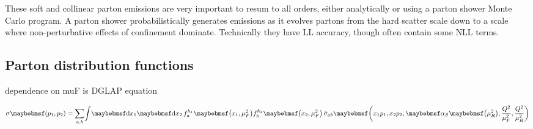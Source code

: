 These soft and collinear parton emissions are very important to resum to all orders, 
either analytically or using a parton shower Monte Carlo program. A parton shower 
probabilistically generates emissions as it evolves partons from the hard scatter scale 
down to a scale where non-perturbative effects of confinement dominate. Technically they 
have \ac{LL} accuracy, though often contain some \ac{NLL} terms.



\subsection{Parton distribution functions}
\label{sec:qcd:pdf}

dependence on muF is DGLAP equation

\begin{equation}
	\sigma\parenths{p_1, p_2} = 
	\sum\limits_{a, b} \! \int \! \d{x_1} \d{x_2} \,
	f_a^{h_1} \parenths{x_1, \mu_F^2} f_b^{h_2} \parenths{x_2, \mu_F^2} \,
	\hat{\sigma}_{ab} \parenths{x_1 p_1, x_2 p_2, \alphaS\parenths{\mu_R^2}, \frac{Q^2}{\mu_F^2}, \frac{Q^2}{\mu_R^2}} 
\end{equation}
